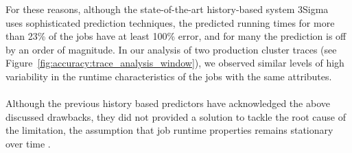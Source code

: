 For these reasons, although the state-of-the-art history-based system 3Sigma~\cite{3Sigma} 
uses sophisticated prediction techniques,
the predicted running times for more than 23\% of the jobs have at
least 100\% error, and for many the prediction is off by an order of
magnitude. In our analysis of two production cluster traces (see
Figure~\ref{fig:accuracy:trace_analysis_window}), we observed similar
levels of high variability in the runtime characteristics of the jobs with the same
attributes.



\paragraph{}
Although the previous history based predictors have acknowledged
the above discussed drawbacks, they did not provided a solution to tackle the
root cause of the limitation, \ie the assumption that
job runtime properties remains stationary over time \cite{jockey:eurosys2012, 3Sigma, morpheus, jamiasvu}.
\fi
